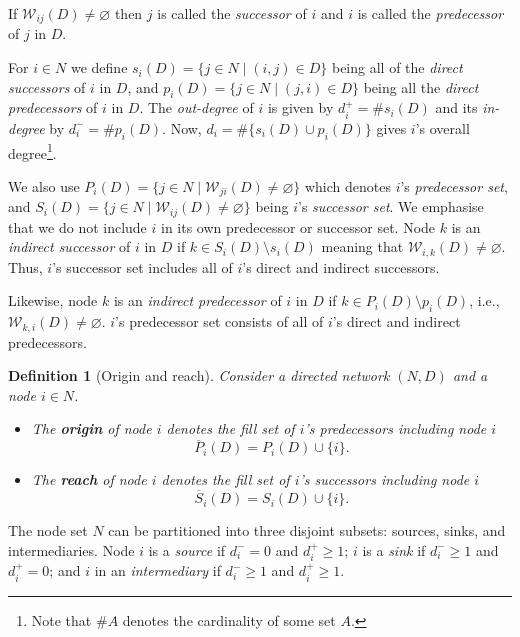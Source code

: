 \documentclass[11pt,fleqn]{article}
\newtheorem{definition}[theorem]{Definition}
\begin{document}
If $\mathcal{W}_{ij} (D) \neq \varnothing$ then $j$ is called the \textit{successor} of $i$ and $i$ is called the \textit{predecessor} of $j$ in $D$.

For $i \in N$ we define $s_{i}(D) = \{ j \in N \mid (i,j) \in D \}$ being all of the \textit{direct successors} of $i$ in $D$, and $p_{i}(D)=\{j \in N \mid (j,i) \in D\}$ being all the \textit{direct predecessors} of $i$ in $D$. The \emph{out-degree} of $i$ is given by $d_{i}^{+} = \# s_{i}(D)$ and its \emph{in-degree} by $d_{i}^{-}= \# p_{i}(D)$. Now, $d_{i} = \# \{ s_{i} (D) \cup p_{i} (D) \}$ gives $i$'s overall degree\footnote{Note that $\#A$ denotes the cardinality of some set $A$.}.

We also use $P_{i}(D)=\{j \in N \mid \mathcal{W}_{ji}(D) \neq \varnothing \}$ which denotes $i$'s \textit{predecessor set}, and $S_{i}(D)= \{j \in N \mid \mathcal{W}_{ij}(D) \neq \varnothing \}$ being $i$'s \textit{successor set}. We emphasise that we do not include $i$ in its own predecessor or successor set. Node $k$ is an \emph{indirect successor} of $i$ in $D$ if $k \in S_{i}(D) \setminus s_i (D)$ meaning that $\mathcal{W}_{i,k}(D) \neq \varnothing$. Thus, $i$'s successor set includes all of $i$'s direct and indirect successors.

Likewise, node $k$ is an \emph{indirect predecessor} of $i$ in $D$ if $k \in P_{i}(D) \setminus p_{i}(D)$, i.e., $\mathcal{W}_{k,i}(D) \neq \varnothing$. $i$'s predecessor set consists of all of $i$'s direct and indirect predecessors.

\begin{definition}[Origin and reach] \label{coverage}
Consider a directed network $(N,D)$ and a node $i \in N$.
\begin{itemize}
\item The \textbf{origin} of node $i$ denotes the fill set of $i$'s predecessors including node $i$
\begin{equation}
\overline{P}_{i}(D) = P_{i}(D) \cup \{i\}.
\end{equation}
\item The \textbf{reach} of node $i$ denotes the fill set of $i$'s successors including node $i$
\begin{equation}
\overline{S}_{i}(D) = S_{i}(D) \cup \{i\}.
\end{equation}
\end{itemize}
\end{definition}

The node set $N$ can be partitioned into three disjoint subsets: sources, sinks, and intermediaries. Node $i$ is a \emph{source} if $d_{i}^{-} = 0$ and $d_{i}^{+} \geqslant 1$; $i$ is a \emph{sink} if $d_{i}^{-} \geqslant 1$ and $d_{i}^{+} = 0$; and $i$ in an \emph{intermediary} if $d_{i}^{-} \geqslant 1$ and $d_{i}^{+} \geqslant 1$.
\end{document}
